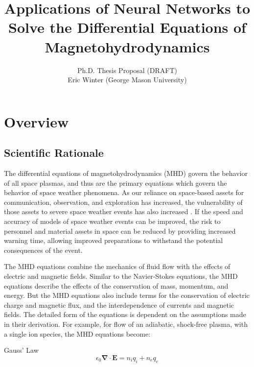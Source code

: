 \documentclass{article}
\title{Applications of Neural Networks to Solve the Differential Equations of Magnetohydrodynamics}
\author{Ph.D. Thesis Proposal (DRAFT)\\Eric Winter (George Mason University)}
\begin{document}
\begin{titlepage}
\maketitle
\end{titlepage}


\tableofcontents


\newpage

\section{Overview}

\subsection{Scientific Rationale}

The differential equations of magnetohydrodynamics (MHD) govern the behavior of all space plasmas, and thus are the primary equations which govern the behavior of space weather phenomena. As our reliance on space-based assets for communication, observation, and exploration has increased, the vulnerability of those assets to severe space weather events has also increased \cite{NRC2009}. If the speed and accuracy of models of space weather events can be improved, the risk to personnel and material assets in space can be reduced by providing increased warning time, allowing improved preparations to withstand the potential consequences of the event.

The MHD equations combine the mechanics of fluid flow with the effects of electric and magnetic fields. Similar to the Navier-Stokes equations, the MHD equations describe the effects of the conservation of mass, momentum, and energy. But the MHD equations also include terms for the conservation of electric charge and magnetic flux, and the interdependence of currents and magnetic fields. The detailed form of the equations is dependent on the assumptions made in their derivation. For example, for flow of an adiabatic, shock-free plasma, with a single ion species, the MHD equations \cite{Chen1984} become:

\bigskip

Gauss' Law
\begin{equation}
    \epsilon_0 \mathbf \nabla \cdotp \mathbf E = n_i q_i + n_e q_e
    \label{eq:GaussLaw}
\end{equation}
\end{document}
